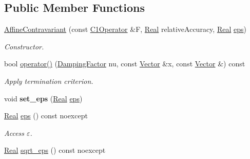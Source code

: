 \subsection*{Public Member Functions}
\begin{DoxyCompactItemize}
\item 
\hypertarget{classSpacy_1_1Newton_1_1Termination_1_1AffineContravariant_a84217ee3e52e0bc40ad2e1ecc13abf9a}{\hyperlink{classSpacy_1_1Newton_1_1Termination_1_1AffineContravariant_a84217ee3e52e0bc40ad2e1ecc13abf9a}{Affine\-Contravariant} (const \hyperlink{classSpacy_1_1C1Operator}{C1\-Operator} \&F, \hyperlink{classSpacy_1_1Real}{Real} relative\-Accuracy, \hyperlink{classSpacy_1_1Real}{Real} \hyperlink{classSpacy_1_1Mixin_1_1Eps_a812b99b0abc1d78a34b4114907f23f52}{eps})}\label{classSpacy_1_1Newton_1_1Termination_1_1AffineContravariant_a84217ee3e52e0bc40ad2e1ecc13abf9a}

\begin{DoxyCompactList}\small\item\em Constructor. \end{DoxyCompactList}\item 
bool \hyperlink{classSpacy_1_1Newton_1_1Termination_1_1AffineContravariant_a16b9829fd882e948b5d273b80c549f4b}{operator()} (\hyperlink{classSpacy_1_1DampingFactor}{Damping\-Factor} nu, const \hyperlink{classSpacy_1_1Vector}{Vector} \&x, const \hyperlink{classSpacy_1_1Vector}{Vector} \&) const 
\begin{DoxyCompactList}\small\item\em Apply termination criterion. \end{DoxyCompactList}\item 
\hypertarget{classSpacy_1_1Mixin_1_1Eps_a818ab6dfab5e4eea583e1302bcc621f8}{void {\bfseries set\-\_\-eps} (\hyperlink{classSpacy_1_1Real}{Real} \hyperlink{classSpacy_1_1Mixin_1_1Eps_a812b99b0abc1d78a34b4114907f23f52}{eps})}\label{classSpacy_1_1Mixin_1_1Eps_a818ab6dfab5e4eea583e1302bcc621f8}

\item 
\hypertarget{classSpacy_1_1Mixin_1_1Eps_a812b99b0abc1d78a34b4114907f23f52}{\hyperlink{classSpacy_1_1Real}{Real} \hyperlink{classSpacy_1_1Mixin_1_1Eps_a812b99b0abc1d78a34b4114907f23f52}{eps} () const noexcept}\label{classSpacy_1_1Mixin_1_1Eps_a812b99b0abc1d78a34b4114907f23f52}

\begin{DoxyCompactList}\small\item\em Access $\varepsilon$. \end{DoxyCompactList}\item 
\hypertarget{classSpacy_1_1Mixin_1_1Eps_a1c1b0ed7f14ed4967dc7da9295a136d4}{\hyperlink{classSpacy_1_1Real}{Real} \hyperlink{classSpacy_1_1Mixin_1_1Eps_a1c1b0ed7f14ed4967dc7da9295a136d4}{sqrt\-\_\-eps} () const noexcept}\label{classSpacy_1_1Mixin_1_1Eps_a1c1b0ed7f14ed4967dc7da9295a136d4}


\end{DoxyCompactItemize}
